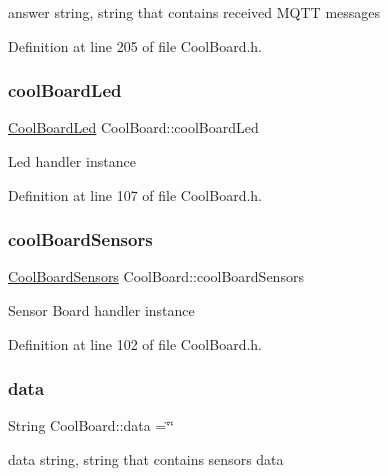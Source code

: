 answer string, string that contains received M\+Q\+TT messages 

Definition at line 205 of file Cool\+Board.\+h.

\mbox{\label{class_cool_board_a1b1d3c684a5baa56b08486e192fd8e97}} 
\subsubsection{\texorpdfstring{cool\+Board\+Led}{coolBoardLed}}
{\footnotesize\ttfamily \hyperlink{class_cool_board_led}{Cool\+Board\+Led} Cool\+Board\+::cool\+Board\+Led\hspace{0.3cm}{\ttfamily [private]}}

Led handler instance 

Definition at line 107 of file Cool\+Board.\+h.

\mbox{\label{class_cool_board_af102be5288bd7f7a8e59b13f86e26a00}} 
\subsubsection{\texorpdfstring{cool\+Board\+Sensors}{coolBoardSensors}}
{\footnotesize\ttfamily \hyperlink{class_cool_board_sensors}{Cool\+Board\+Sensors} Cool\+Board\+::cool\+Board\+Sensors\hspace{0.3cm}{\ttfamily [private]}}

Sensor Board handler instance 

Definition at line 102 of file Cool\+Board.\+h.

\mbox{\label{class_cool_board_a427fb753dd8575bdf821c70a5c63d695}} 
\subsubsection{\texorpdfstring{data}{data}}
{\footnotesize\ttfamily String Cool\+Board\+::data =\char`\"{}\char`\"{}\hspace{0.3cm}{\ttfamily [private]}}

data string, string that contains sensors data 

